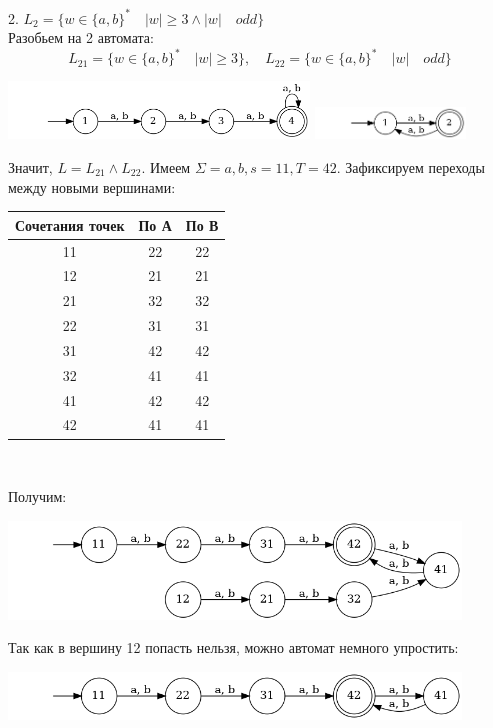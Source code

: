 \documentclass{article}
\begin{document}
    2. $L_2 = \{w \in \{a, b\}^* \quad |w| \geq 3 \wedge |w|\quad odd\}$\\
    Разобьем на 2 автомата:
    $$L_21 = \{w \in \{a, b\}^* \quad |w| \geq 3\}, \quad L_22 = \{w \in \{a, b\}^* \quad |w|\quad odd\}$$
    \begin{center}
        \includegraphics[width=0.6\textwidth]{pic9.dot}
        \includegraphics[width=0.3\textwidth]{pic10.dot}
    \end{center}
    Значит, $L = L_21 \wedge L_22$. Имеем $\Sigma = {a, b}, s = 11, T = 42$. Зафиксируем переходы между новыми вершинами:
    \begin{center}
        \begin{tabular}{|c|c|c|}
            \hline
            Сочетания точек & По А & По В \\
            \hline
            11 & 22 & 22\\
            12 & 21 & 21\\
            21 & 32 & 32\\
            22 & 31 & 31\\
            31 & 42 & 42\\
            32 & 41 & 41\\
            41 & 42 & 42\\
            42 & 41 & 41\\
            \hline
        \end{tabular}\\
    \end{center}
    Получим:
    \begin{center}
        \includegraphics[width=0.9\textwidth]{pic11.dot}\\
    \end{center}
    Так как в вершину 12 попасть нельзя, можно автомат немного упростить:
    \begin{center}
        \includegraphics[width=0.9\textwidth]{pic12.dot}\\
    \end{center}
    
\end{document}
